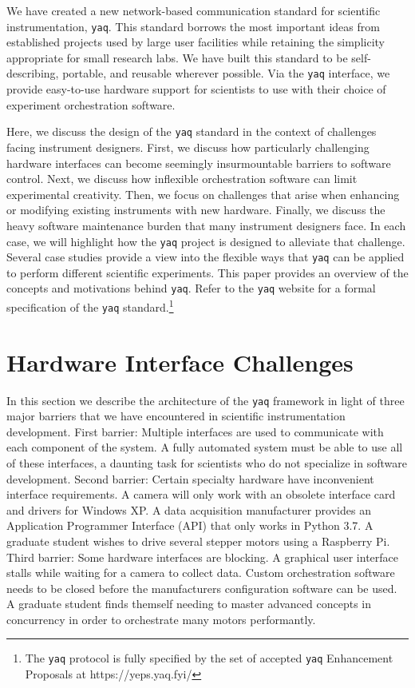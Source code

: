 \documentclass[aip, amsmath, amssymb, reprint,]{revtex4-2}
\newcommand\yaq{\texttt{yaq}}
\begin{document}
We have created a new network-based communication standard for scientific instrumentation, \yaq{}.
This standard borrows the most important ideas from established projects used by large user facilities while retaining the simplicity appropriate for small research labs.
We have built this standard to be self-describing, portable, and reusable wherever possible.
Via the \yaq{} interface, we provide easy-to-use hardware support for scientists to use with their choice of experiment orchestration software.

Here, we discuss the design of the \yaq{} standard in the context of challenges facing instrument designers.
First, we discuss how particularly challenging hardware interfaces can become seemingly insurmountable barriers to software control.
Next, we discuss how inflexible orchestration software can limit experimental creativity.
Then, we focus on challenges that arise when enhancing or modifying existing instruments with new hardware.
Finally, we discuss the heavy software maintenance burden that many instrument designers face.
In each case, we will highlight how the \yaq{} project is designed to alleviate that challenge.
Several case studies provide a view into the flexible ways that \yaq{} can be applied to perform different scientific experiments.
This paper provides an overview of the concepts and motivations behind \yaq{}.
Refer to the \yaq{} website for a formal specification of the \yaq{} standard.\footnote{The \yaq{} protocol is fully specified by the set of accepted \yaq{} Enhancement Proposals at https://yeps.yaq.fyi/}

\section{Hardware Interface Challenges}

In this section we describe the architecture of the \yaq{} framework in light of three major barriers that we have encountered in scientific instrumentation development.
First barrier: Multiple interfaces are used to communicate with each component of the system.
A fully automated system must be able to use all of these interfaces, a daunting task for scientists who do not specialize in software development.
Second barrier: Certain specialty hardware have inconvenient interface requirements.
A camera will only work with an obsolete interface card and drivers for Windows XP.
A data acquisition manufacturer provides an Application Programmer Interface (API) that only works in Python 3.7.
A graduate student wishes to drive several stepper motors using a Raspberry Pi.
Third barrier: Some hardware interfaces are blocking.
A graphical user interface stalls while waiting for a camera to collect data.
Custom orchestration software needs to be closed before the manufacturers configuration software can be used.
A graduate student finds themself needing to master advanced concepts in concurrency in order to orchestrate many motors performantly.
\end{document}
